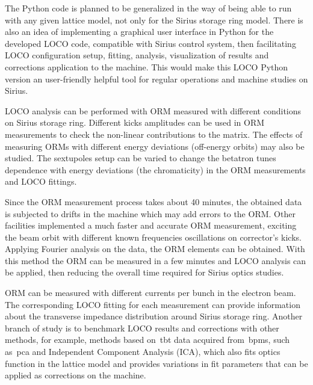 The Python code is planned to be generalized in the way of being able to run with any given lattice model, not only for the Sirius storage ring model. There is also an idea of implementing a graphical user interface in Python for the developed LOCO code, compatible with Sirius control system, then facilitating LOCO configuration setup, fitting, analysis, visualization of results and corrections application to the machine. This would make this LOCO Python version an user-friendly helpful tool for regular operations and machine studies on Sirius. 

LOCO analysis can be performed with ORM measured with different conditions on Sirius storage ring. Different kicks amplitudes can be used in ORM measurements to check the non-linear contributions to the matrix. The effects of measuring ORMs with different energy deviations (off-energy orbits) may also be studied. The sextupoles setup can be varied to change the betatron tunes dependence with energy deviations (the chromaticity) in the ORM measurements and LOCO fittings.

Since the ORM measurement process takes about 40 minutes, the obtained data is subjected to drifts in the machine which may add errors to the ORM. Other facilities implemented a much faster and accurate ORM measurement, exciting the beam orbit with different known frequencies oscillations on corrector's kicks. Applying Fourier analysis on the data, the ORM elements can be obtained. With this method the ORM can be measured in a few minutes and LOCO analysis can be applied, then reducing the overall time required for Sirius optics studies.

ORM can be measured with different currents per bunch in the electron beam. The corresponding LOCO fitting for each measurement can provide information about the transverse impedance distribution around Sirius storage ring.  
Another branch of study is to benchmark LOCO results and corrections with other methods, for example, methods based on~\gls{tbt} data acquired from~\glspl{bpm}, such as~\gls{pca} and Independent Component Analysis (ICA), which also fits optics function in the lattice model and provides variations in fit parameters that can be applied as corrections on the machine.